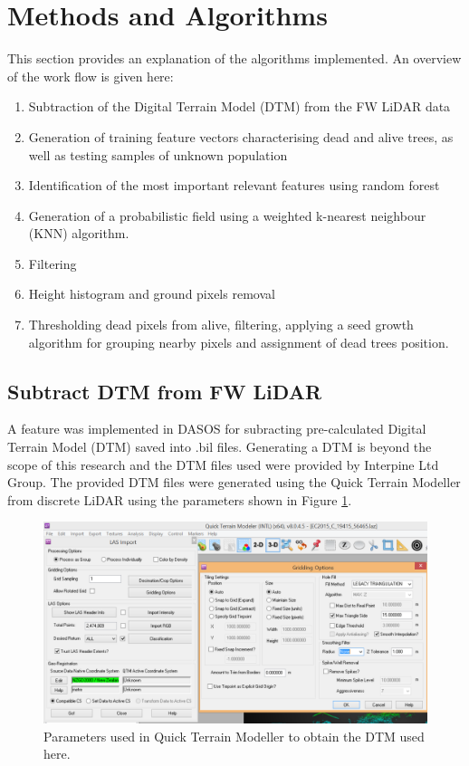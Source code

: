 \documentclass{subfiles}
\begin{document}
\section{Methods and Algorithms}\label{sec:Methodology}

\par This section provides an explanation of the algorithms implemented. An overview of the work flow is given here: 
\begin{enumerate}
	\item Subtraction of the Digital Terrain Model (DTM) from the FW LiDAR data
	\item Generation of training feature vectors characterising dead and alive trees, as well as testing samples of unknown population
	\item Identification of the most important relevant features using random forest
	\item Generation of a probabilistic field using a weighted k-nearest neighbour (KNN) algorithm. 
	\item Filtering 
	\item Height histogram and ground pixels removal
	\item Thresholding dead pixels from alive, filtering, applying a seed growth algorithm for grouping nearby pixels and assignment of dead trees position.  
\end{enumerate}

\subsection{Subtract DTM from FW LiDAR}\label{sec:DTMsub}

\par A feature was implemented in DASOS for subracting pre-calculated Digital Terrain Model (DTM) saved into .bil files. Generating a DTM is beyond the scope of this research and the DTM files used were provided by Interpine Ltd Group. The provided DTM files were generated using the Quick Terrain Modeller from discrete LiDAR using the parameters shown in Figure \ref{fig:DTM_parameters}.

\begin{figure} [h!]
	\centering
	\includegraphics[width=\textwidth]{img/dead/DTM_parameters}
	\caption{Parameters used in Quick Terrain Modeller to obtain the DTM used here.}
	\label{fig:DTM_parameters}
\end{figure}
\end{document}
